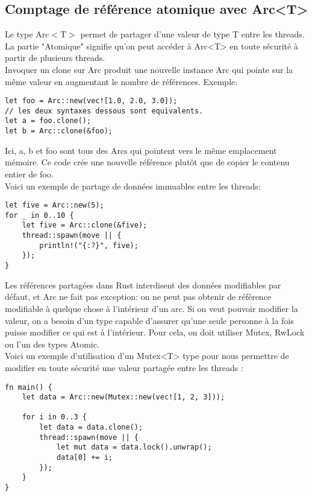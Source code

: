 \documentclass{article}
\begin{document}
\subsection{Comptage de référence atomique avec Arc<T>}
Le type Arc$<$T$>$  permet de partager d'une valeur de type T  entre les threads.
La partie "Atomique" signifie qu’on peut accéder à Arc<T> en toute sécurité à partir de plusieurs threads. \\
Invoquer un clone sur Arc produit une nouvelle instance Arc qui pointe sur la même valeur en augmentant le nombre de références.
Exemple: 
\begin{lstlisting}
let foo = Arc::new(vec![1.0, 2.0, 3.0]);
// les deux syntaxes dessous sont equivalents.
let a = foo.clone();
let b = Arc::clone(&foo);
\end{lstlisting}
Ici, a, b et foo sont tous des Arcs qui pointent vers le même emplacement mémoire.
Ce code crée une nouvelle référence plutôt que de copier le contenu entier de foo.\\
Voici un exemple de partage de données immuables entre les threads:
\begin{lstlisting}
let five = Arc::new(5);
for _ in 0..10 {
    let five = Arc::clone(&five);
    thread::spawn(move || {
        println!("{:?}", five);
    });
}
\end{lstlisting}
Les références partagées dans Rust interdisent des données modifiables par défaut, et Arc ne fait pas exception: on ne peut pas obtenir de référence modifiable à quelque chose à l'intérieur d'un arc.
Si on veut pouvoir modifier la valeur, on a besoin d’un type capable d’assurer qu’une seule personne à la fois puisse modifier ce qui est à l’intérieur. Pour cela, on doit utiliser Mutex, RwLock ou l’un des types Atomic.\\
Voici un exemple d'utilisation d'un Mutex<T> type pour nous permettre de modifier en toute sécurité une valeur partagée entre les threads :
\begin{lstlisting}
fn main() {
    let data = Arc::new(Mutex::new(vec![1, 2, 3]));

    for i in 0..3 {
        let data = data.clone();
        thread::spawn(move || {
            let mut data = data.lock().unwrap();
            data[0] += i;
        });
    }
}
\end{lstlisting}
\end{document}
